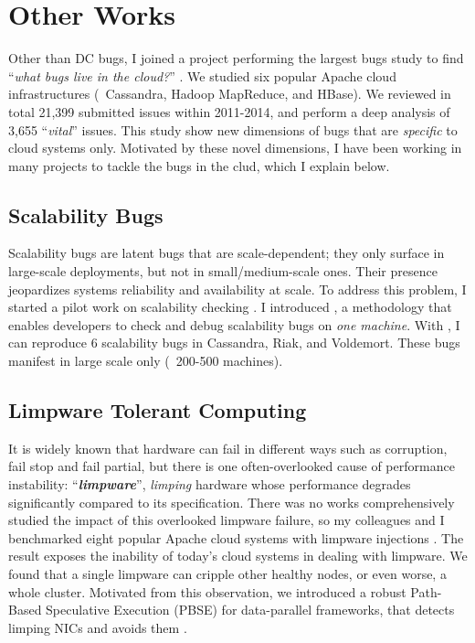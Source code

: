 \documentclass[11pt]{article}
\begin{document}
\section{Other Works}

Other than DC bugs, I joined a project performing the largest bugs study to find
``\textit{what bugs live in the cloud?}'' \cite{Gunawi+14-Cbs}. We studied six
popular Apache cloud infrastructures (\eg\ Cassandra, Hadoop MapReduce, and
HBase). We reviewed in total 21,399 submitted issues within 2011-2014, and
perform a deep analysis of 3,655 ``\textit{vital}'' issues. This study show new
dimensions of bugs that are \textit{specific} to cloud systems only. Motivated
by these novel dimensions, I have been working in many projects to tackle the
bugs in the clud, which I explain below.

\subsection{Scalability Bugs}

Scalability bugs are latent bugs that are scale-dependent; they only surface in
large-scale deployments, but not in small/medium-scale ones. Their presence
jeopardizes systems reliability and availability at scale. 
%
To address this problem, I started a pilot work on scalability checking
\cite{Gunawi+17-ScaleCheck-Insub}. I introduced \sck, a methodology that enables
developers to check and debug scalability bugs on \textit{one machine}. With
\sck, I can reproduce 6 scalability bugs in Cassandra, Riak, and Voldemort.
These bugs manifest in large scale only (\eg\ 200-500 machines). 

\subsection{Limpware Tolerant Computing}

It is widely known that hardware can fail in different ways such as corruption,
fail stop and fail partial, but there is one often-overlooked cause of
performance instability: ``\textbf{\textit{limpware}}'', \textit{limping}
hardware whose performance degrades significantly compared to its specification.
There was no works comprehensively studied the impact of this overlooked
limpware failure, so my colleagues and I benchmarked eight popular Apache cloud
systems with limpware injections \cite{Do+13-Limplock}. The result exposes the
inability of today's cloud systems in dealing with limpware. We found that a
single limpware can cripple other healthy nodes, or even worse, a whole cluster.
Motivated from this observation, we introduced a robust Path-Based Speculative
Execution (PBSE) for data-parallel frameworks, that detects limping NICs and
avoids them \cite{Suminto+17-PBSE-InSub}.
\end{document}
